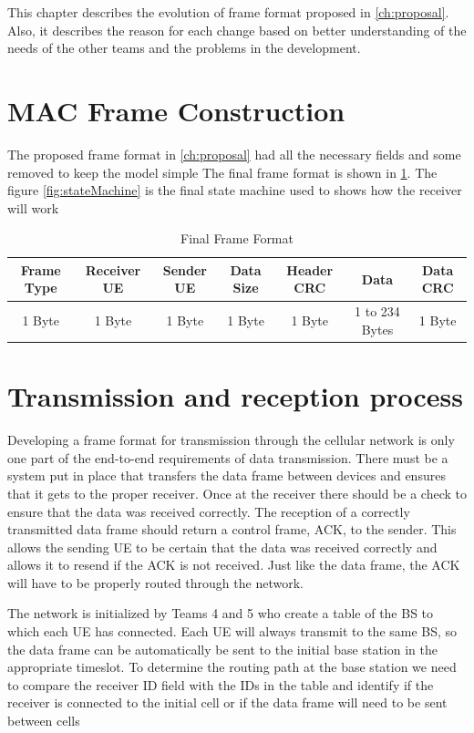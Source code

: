 This chapter describes the evolution of frame format proposed in \ref{ch:proposal}. Also, it describes the reason
 for each change based on better understanding of the needs of the other teams and the problems in the development.


\section{MAC Frame Construction}
The proposed frame format in \ref{ch:proposal} had all the necessary fields and some removed to keep the model simple
The final frame format is  shown in \ref{tab:finalFrame}.
The figure \ref{fig:stateMachine} is the final state machine used to shows how the receiver will work

\begin{table}
\begin{tabular}{| c | c | c | c | c | c | c | }
  \hline                       
  Frame Type & Receiver UE & Sender UE & Data Size & Header CRC & Data & Data CRC\\
  \hline
	1 Byte & 1 Byte & 1 Byte & 1 Byte & 1 Byte & 1 to 234 Bytes & 1 Byte\\
  
  \hline  
\end{tabular}
 \caption{Final Frame Format}
	\label{tab:finalFrame}
\end{table}

\section{Transmission and reception process}

Developing a frame format for transmission through the cellular network is only one part of the end-to-end requirements of data transmission. There must be a system put in place that transfers the data frame between devices and ensures that it gets to the proper receiver. Once at the receiver there should be a check to ensure that the data was received correctly. The reception of a correctly transmitted data frame should return a control frame, ACK, to the sender.  This allows the sending UE to be certain that the data was received correctly and allows it to resend if the ACK is not received. Just like the data frame, the ACK will have to be properly routed through the network. 

The network is initialized by Teams 4 and 5 who create a table of the BS to which each UE has connected. Each UE will always transmit to the same BS, so the data frame can be automatically be sent to the initial base station in the appropriate timeslot.  To determine the routing path at the base station we need to compare the receiver ID field with the IDs in the table and identify if the receiver is connected to the initial cell or if the data frame will need to be sent between cells




